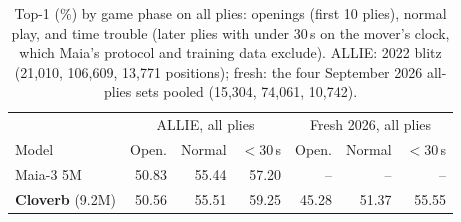 \begin{table}[t]\centering\small
\caption{Top-1 (\%) by game phase on all plies: openings (first 10 plies), normal play, and time trouble (later plies with under 30\,s on the mover's clock, which Maia's protocol and training data exclude). ALLIE: 2022 blitz (21,010, 106,609, 13,771 positions); fresh: the four September 2026 all-plies sets pooled (15,304, 74,061, 10,742).}\label{tab:segments}
\begin{tabular}{lrrrrrr}\toprule
 & \multicolumn{3}{c}{ALLIE, all plies} & \multicolumn{3}{c}{Fresh 2026, all plies}\\
Model & Open. & Normal & $<$30\,s & Open. & Normal & $<$30\,s\\\midrule
Maia-3 5M & 50.83 & 55.44 & 57.20 & -- & -- & -- \\
\textbf{Cloverb} (9.2M) & 50.56 & 55.51 & 59.25 & 45.28 & 51.37 & 55.55 \\
\bottomrule\end{tabular}\end{table}
